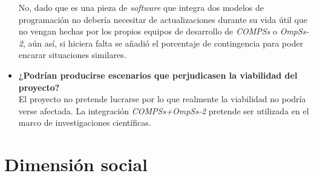 \begin{itemize}
	No, dado que es una pieza de \textit{software} que integra dos modelos de programación no debería necesitar de actualizaciones durante su vida útil que no vengan hechas por los propios equipos de desarrollo de \textit{COMPSs} o \textit{OmpSs-2}, aún así, si hiciera falta se añadió el porcentaje de contingencia para poder encarar situaciones similares.
	
	\item \textbf{¿Podrían producirse escenarios que perjudicasen la viabilidad del proyecto?} \\
	
	El proyecto no pretende lucrarse por lo que realmente la viabilidad no podría verse afectada. La integración \textit{COMPSs+OmpSs-2} pretende ser utilizada en el marco de investigaciones científicas.
	
\end{itemize}

\section{Dimensión social}

